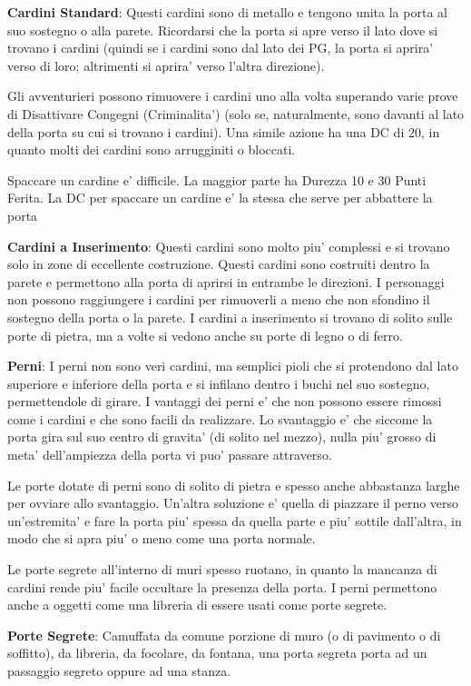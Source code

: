 \documentclass[a4paper,11pt,twoside,openany]{dndbook}
\begin{document}
\textbf{Cardini Standard}: Questi cardini sono di metallo e tengono unita la porta al suo sostegno o alla parete. Ricordarsi che la porta si apre verso il lato dove si trovano i cardini (quindi se i cardini sono dal lato dei PG, la porta si aprira' verso di loro; altrimenti si aprira' verso l’altra direzione). 

Gli avventurieri possono rimuovere i cardini uno alla volta superando varie prove di Disattivare Congegni (Criminalita') (solo se, naturalmente, sono davanti al lato della porta su cui si trovano i cardini). Una simile azione ha una DC di 20, in quanto molti dei cardini sono arrugginiti o bloccati. 

Spaccare un cardine e' difficile. La maggior parte ha Durezza 10 e 30 Punti Ferita. La DC per spaccare un cardine e' la stessa che serve per abbattere la porta

\textbf{Cardini a Inserimento}: Questi cardini sono molto piu' complessi e si trovano solo in zone di eccellente costruzione. Questi cardini sono costruiti dentro la parete e permettono alla porta di aprirsi in entrambe le direzioni. I personaggi non possono raggiungere i cardini per rimuoverli a meno che non sfondino il sostegno della porta o la parete. I cardini a inserimento si trovano di solito sulle porte di pietra, ma a volte si vedono anche su porte di legno o di ferro.

\textbf{Perni}: I perni non sono veri cardini, ma semplici pioli che si protendono dal lato superiore e inferiore della porta e si infilano dentro i buchi nel suo sostegno, permettendole di girare. I vantaggi dei perni e' che non possono essere rimossi come i cardini e che sono facili da realizzare. Lo svantaggio e' che siccome la porta gira sul suo centro di gravita' (di solito nel mezzo), nulla piu' grosso di meta' dell'ampiezza della porta vi puo' passare attraverso.

Le porte dotate di perni sono di solito di pietra e spesso anche abbastanza larghe per ovviare allo svantaggio. Un'altra soluzione e' quella di piazzare il perno verso un'estremita' e fare la porta piu' spessa da quella parte e piu' sottile dall'altra, in modo che si apra piu' o meno come una porta normale.

Le porte segrete all'interno di muri spesso ruotano, in quanto la mancanza di cardini rende piu' facile occultare la presenza della porta. I perni permettono anche a oggetti come una libreria di essere usati come porte segrete.

\textbf{Porte Segrete}: Camuffata da comune porzione di muro (o di pavimento o di soffitto), da libreria, da focolare, da fontana, una porta segreta porta ad un passaggio segreto oppure ad una stanza.
\end{document}
